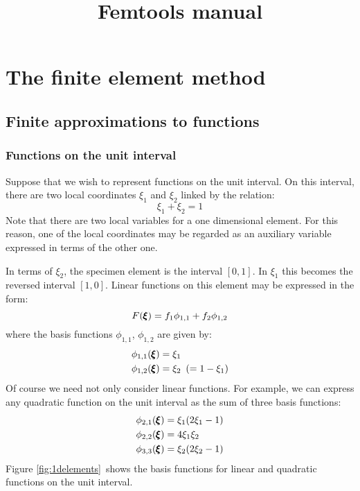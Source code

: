 \documentclass[a4paper, 11pt]{book}
\title{Femtools manual}
\begin{document}
\maketitle

\tableofcontents

\part{The finite element method}

\chapter{Finite approximations to functions}

\section{Functions on the unit interval}\label{sec:1dfunc}

Suppose that we wish to represent functions on the unit interval. On this
interval, there are two local coordinates $\xi_1$ and $\xi_2$ linked by the
relation:
\begin{equation}
  \xi_1 + \xi_2 = 1
\end{equation}
Note that there are two local variables for a one dimensional element. For
this reason, one of the local coordinates may be regarded as an auxiliary
variable expressed in terms of the other one.

In terms of $\xi_2$, the specimen element is the interval $[0,1]$. In $\xi_1$ this becomes the reversed interval $[1,0]$. Linear
functions on this element may be expressed in the form:
\begin{equation}
  F(\pmb{\xi}) = f_1\phi_{1,1} + f_2\phi_{1,2}
\end{equation}
where the basis functions $\phi_{1,1}$, $\phi_{1,2}$ are given by:
\begin{align}
  \phi_{1,1}(\pmb{\xi}) &= \xi_1\\
  \phi_{1,2}(\pmb{\xi}) &= \xi_2\ \left(=1-\xi_1\right)
\end{align}
Of course we need not only consider linear functions. For example, we can
express any quadratic function on the unit interval as the sum of three
basis functions:
\begin{align}
  \phi_{2,1}(\pmb{\xi}) &= \xi_1(2\xi_1-1)\\
  \phi_{2,2}(\pmb{\xi}) &= 4\xi_1\xi_2\\
  \phi_{3,3}(\pmb{\xi}) &= \xi_2(2\xi_2-1)
\end{align}
Figure \ref{fig:1delements}\ shows the basis functions for linear and
quadratic functions on the unit interval.
\end{document}
